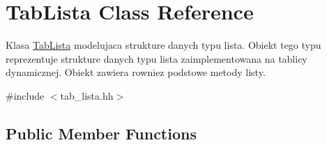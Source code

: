 \hypertarget{class_tab_lista}{\section{Tab\-Lista Class Reference}
\label{class_tab_lista}
}


Klasa \hyperlink{class_tab_lista}{Tab\-Lista} modelujaca strukture danych typu lista. Obiekt tego typu reprezentuje strukture danych typu lista zaimplementowana na tablicy dynamicznej. Obiekt zawiera rowniez podstowe metody listy.  




{\ttfamily \#include $<$tab\-\_\-lista.\-hh$>$}

\subsection*{Public Member Functions}
